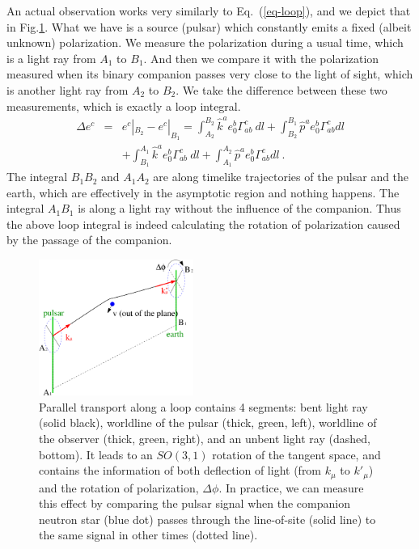 \documentclass[aps,showpacs,twocolumn,floats,prd,superscriptaddress,nofootinbib]{revtex4-1}
\begin{document}
An actual observation works very similarly to Eq.~(\ref{eq-loop}), and we depict that in Fig.\ref{fig:loop}.
What we have is a source (pulsar) which constantly emits a fixed (albeit unknown) polarization. 
We measure the polarization during a usual time, which is a light ray from $A_1$ to $B_1$. 
And then we compare it with the polarization measured when its binary companion passes very close to the light of sight, which is another light ray from $A_2$ to $B_2$. 
We take the difference between these two measurements, which is exactly a loop integral.
\begin{eqnarray}
\Delta e^c &=& e^c|_{ B_2} - e^c|_{ B_1}
= \int_{A_2}^{B_2} \hat{k}^a e_0^b \Gamma_{ab}^c~dl
 + \int_{B_2}^{B_1} \hat{p}^a e_0^b \Gamma_{ab}^c dl  \nonumber \\ 
&&+ \int_{B_1}^{A_1} \hat{k}^a e_0^b \Gamma_{ab}^c~dl +
\int_{A_1}^{A_2} \hat{p}^a e_0^b \Gamma_{ab}^c dl~.
\label{eq-pulsar}
\end{eqnarray}
The integral $B_1B_2$ and $A_1A_2$ are along timelike trajectories of the pulsar and the earth, which are effectively in the asymptotic region and nothing happens. 
The integral $A_1B_1$ is along a light ray without the influence of the companion. 
Thus the above loop integral is indeed calculating the rotation of polarization caused by the passage of the companion.

\begin{figure}
\includegraphics[width=0.45\textwidth]{loop.pdf}
\caption{\label{fig:loop}
Parallel transport along a loop contains 4 segments: bent light ray (solid black), worldline of the pulsar (thick, green, left), worldline of the observer (thick, green, right), and an unbent light ray (dashed, bottom). It leads to an $SO(3,1)$ rotation of the tangent space, and contains the information of both deflection of light (from $k_\mu$ to $k'_\mu$) and the rotation of polarization, $\Delta\phi$. In practice, we can measure this effect by comparing the pulsar signal when the companion neutron star (blue dot) passes through the line-of-site (solid line) to the same signal in other times (dotted line).
}
\end{figure}
\end{document}
